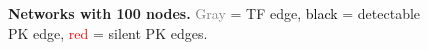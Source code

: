 \begin{frame}
\begin{columns}
\begin{column}{0.6\textwidth}
{\begin{figure}[ht]
    \caption{\textbf{Networks with 100 nodes.} \textcolor{gray}{Gray} = TF edge, \textcolor{black}{black} = detectable PK edge, \textcolor{red}{red} = silent PK edges. }
    \label{fig:dream4_nets100}
\end{figure}}
\end{column}
\end{columns}
\end{frame}


